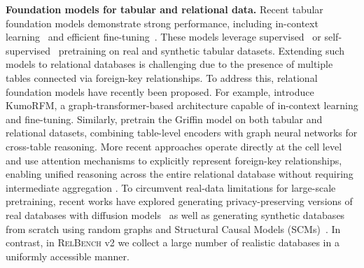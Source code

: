 \documentclass{article} %
\newcommand{\relbench}{\textsc{RelBench}\xspace}
\begin{document}

\textbf{Foundation models for tabular and relational data.} Recent tabular foundation models demonstrate strong performance, including in-context learning~\citep{tabpfn, tabicl} and efficient fine-tuning~\citep{carte}. These models leverage supervised~\citep{tabpfn, tabpfnv2} or self-supervised~\citep{portal, carte} pretraining on real and synthetic tabular datasets. Extending such models to relational databases is challenging due to the presence of multiple tables connected via foreign-key relationships. To address this, relational foundation models have recently been proposed. For example, \citet{kumorfm} introduce KumoRFM, a graph-transformer-based architecture capable of in-context learning and fine-tuning. Similarly, \citet{griffin} pretrain the Griffin model on both tabular and relational datasets, combining table-level encoders with graph neural networks for cross-table reasoning. More recent approaches operate directly at the cell level and use attention mechanisms to explicitly represent foreign-key relationships, enabling unified reasoning across the entire relational database without requiring intermediate aggregation \citep{ranjan2025relational}.
To circumvent real-data limitations for large-scale pretraining, recent works have explored generating privacy-preserving versions of real databases with diffusion models~\citep{hudovernik2025reldiff,ketata2025joint} as well as generating synthetic databases from scratch using random graphs and Structural Causal Models (SCMs)~\citep{kothapalli2026plurel}. In contrast, in \relbench v2 we collect a large number of realistic databases in a uniformly accessible manner.
\end{document}
